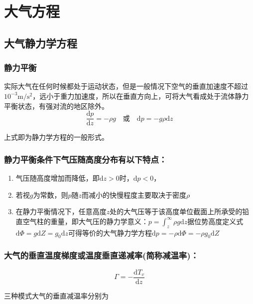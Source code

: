 \documentclass[UTF8,a4paper,11pt,oneside]{ctexbook}
\begin{document}
\chapter{大气方程}

\section{大气静力学方程}

\subsection{静力平衡}

实际大气在任何时候都处于运动状态，但是一般情况下空气的垂直加速度不超过\(10^{-3}\mathrm{m/s^2}\)，远小于重力加速度，所以在垂直方向上，可将大气看成处于流体静力平衡状态，有强对流的地区除外。
\begin{equation}
\dfrac{\mathrm{d}p}{\mathrm{d}z}=-\rho{}g\quad\text{或}\quad\mathrm{d}p=-g\rho\mathrm{d}z
\end{equation}

上式即为静力学方程的一般形式。

\subsection{静力平衡条件下气压随高度分布有以下特点：}
\begin{enumerate}
    \item 气压随高度增加而降低，即\(\mathrm{d}z>0\)时，\(\mathrm{d}p<0\)，
    \item 若视\(g\)为常数，则\(p\)随\(z\)而减小的快慢程度主要取决于密度\(\rho\)
    \item 在静力平衡情况下，任意高度\(z\)处的大气压等于该高度单位截面上所承受的铅直空气柱的重量，即大气压的静力学意义：\(p=\int_z^\infty\rho{}g\mathrm{d}z\)据位势高度定义式\(\mathrm{d}\Phi=g\mathrm{d}Z=g_0\mathrm{d}z\)可得等价的大气静力学方程\(\mathrm{d}p=-\rho\mathrm{d}\Phi=-\rho{}g_0\mathrm{d}Z\)
\end{enumerate}

\subsection{大气的垂直温度梯度或温度垂直递减率(简称减温率)：}
\begin{equation}
\Gamma=-\dfrac{\mathrm{d}T_v}{\mathrm{d}z}
\end{equation}

三种模式大气的垂直减温率分别为
\end{document}
